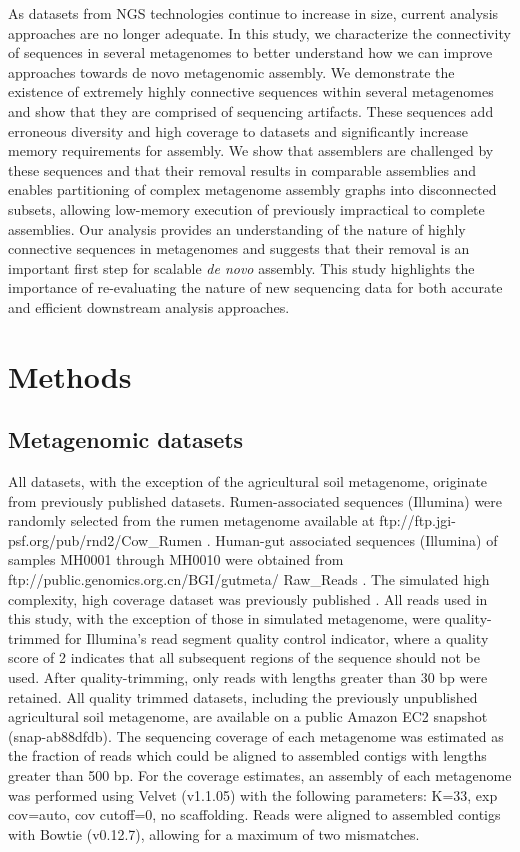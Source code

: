\documentclass[10pt]{article}
\begin{document}
As datasets from NGS technologies continue to increase in size, current analysis approaches are no longer adequate.  In this study, we characterize the connectivity of sequences in several metagenomes to better understand how we can improve approaches towards {de novo} metagenomic assembly.  We demonstrate the existence of extremely highly connective sequences within several metagenomes and show that they are comprised of sequencing artifacts.  These sequences add erroneous diversity and high coverage to datasets and significantly increase memory requirements for assembly.  We show that assemblers are challenged by these sequences and that their removal results in comparable assemblies and enables partitioning of complex metagenome assembly graphs into disconnected subsets, allowing low-memory execution of previously impractical to complete assemblies.  Our analysis provides an understanding of the nature of highly connective sequences in metagenomes and suggests that their removal is an important first step for scalable \emph{de novo} assembly.  This study highlights the importance of re-evaluating the nature of new sequencing data for both accurate and efficient downstream analysis approaches. 

\section*{Methods}

\subsection*{Metagenomic datasets}
All datasets, with the exception of the agricultural soil metagenome, originate from previously published datasets. Rumen-associated sequences (Illumina) were randomly selected from the rumen metagenome available at ftp://ftp.jgi-psf.org/pub/rnd2/Cow\_Rumen \cite{Hess:2011p686}. Human-gut associated sequences (Illumina) of samples MH0001 through MH0010 were obtained from 
ftp://public.genomics.org.cn/BGI/gutmeta/ Raw\_Reads \cite{Qin:2010p189}.  The simulated high complexity, high coverage dataset was previously published \cite{Pignatelli:2011p742}.  All reads used in this study, with the exception of those in simulated metagenome, were quality-trimmed for Illumina's read segment quality control indicator, where a quality score of 2 indicates that all subsequent regions of the sequence should not be used. After quality-trimming, only reads with lengths greater than 30 bp were retained. All quality trimmed datasets, including the previously unpublished agricultural soil metagenome, are available on a public Amazon EC2 snapshot (snap-ab88dfdb).  The sequencing coverage of each metagenome was estimated as the fraction of reads which could be aligned to assembled contigs with lengths greater than 500 bp.  For the coverage estimates, an assembly of each metagenome was performed using Velvet (v1.1.05) with the following parameters:  K=33, exp cov=auto, cov cutoff=0, no scaffolding.  Reads were aligned to assembled contigs with Bowtie (v0.12.7), allowing for a maximum of two mismatches.  
\end{document}
